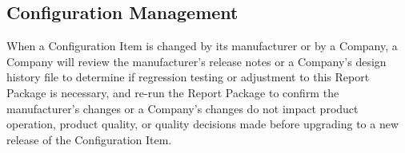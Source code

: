 \subsection{Configuration Management}
When a Configuration Item is changed by its manufacturer or by a Company,
a Company will review the manufacturer's release notes or a Company's design
history file to determine if regression testing or adjustment to this Report
Package is necessary, and re-run the Report Package to confirm the
manufacturer's changes or a Company's changes do not impact product operation,
product quality, or quality decisions made before upgrading to a new release of
the Configuration Item.
